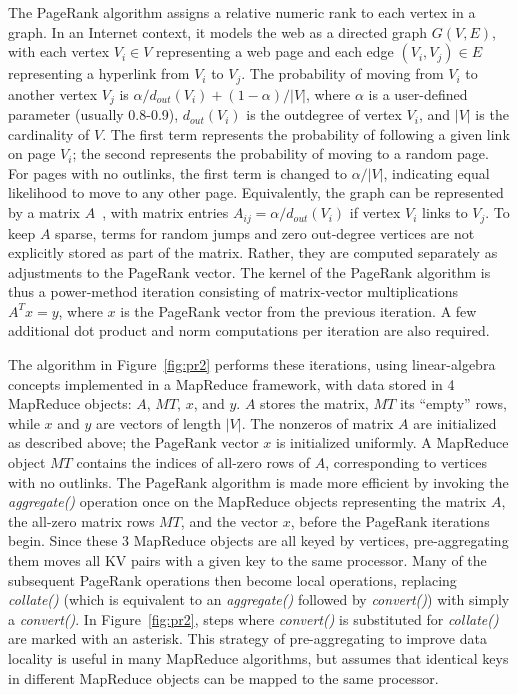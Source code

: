 The PageRank algorithm assigns a relative numeric rank to each vertex
in a graph.  In an Internet context, it models the web as a directed
graph $G(V,E)$, with each vertex $V_i \in V$ representing a web page
and each edge $(V_i, V_j) \in E$ representing a hyperlink from $V_i$
to $V_j$.  The probability of moving from $V_i$ to another vertex
$V_j$ is $\alpha/d_{out}(V_i) + (1-\alpha)/|V|$, where $\alpha$ is a
user-defined parameter (usually 0.8-0.9), $d_{out}(V_i)$ is the
outdegree of vertex $V_i$, and $|V|$ is the cardinality of $V$.  The
first term represents the probability of following a given link on
page $V_i$; the second represents the probability of moving to a
random page.  For pages with no outlinks, the first term is changed to
$\alpha/|V|$, indicating equal likelihood to move to any other page.
Equivalently, the graph can be represented by a matrix
$A$~\cite{LangvilleMeyer05a}, with matrix entries $A_{ij} =
\alpha/d_{out}(V_i)$ if vertex $V_i$ links to $V_j$.  To keep $A$
sparse, terms for random jumps and zero out-degree vertices are not
explicitly stored as part of the matrix.  Rather, they are computed
separately as adjustments to the PageRank vector.  The kernel of the
PageRank algorithm is thus a power-method iteration consisting of
matrix-vector multiplications $A^T x=y$, where $x$ is the PageRank
vector from the previous iteration.  A few additional dot product and
norm computations per iteration are also required.

The algorithm in Figure~\ref{fig:pr2} performs these iterations, using
linear-algebra concepts implemented in a MapReduce framework, with
data stored in 4 MapReduce objects: $A$, $MT$, $x$, and $y$.  $A$
stores the matrix, $MT$ its ``empty'' rows, while $x$ and $y$ are
vectors of length $|V|$.  The nonzeros of matrix $A$ are initialized
as described above; the PageRank vector $x$ is initialized uniformly.
A MapReduce object $MT$ contains the indices of all-zero rows of $A$,
corresponding to vertices with no outlinks.  The PageRank algorithm is
made more efficient by invoking the {\it aggregate()} operation once
on the MapReduce objects representing the matrix $A$, the all-zero
matrix rows $MT$, and the vector $x$, before the PageRank iterations
begin.  Since these 3 MapReduce objects are all keyed by vertices,
pre-aggregating them moves all KV pairs with a given key to the same
processor.  Many of the subsequent PageRank operations then become
local operations, replacing {\it collate()} (which is equivalent to an
{\it aggregate()} followed by {\it convert()}) with simply a {\it
convert()}.  In Figure~\ref{fig:pr2}, steps where {\it convert()} is
substituted for {\it collate()} are marked with an asterisk.  This
strategy of pre-aggregating to improve data locality is useful in many
MapReduce algorithms, but assumes that identical keys in different
MapReduce objects can be mapped to the same processor.

